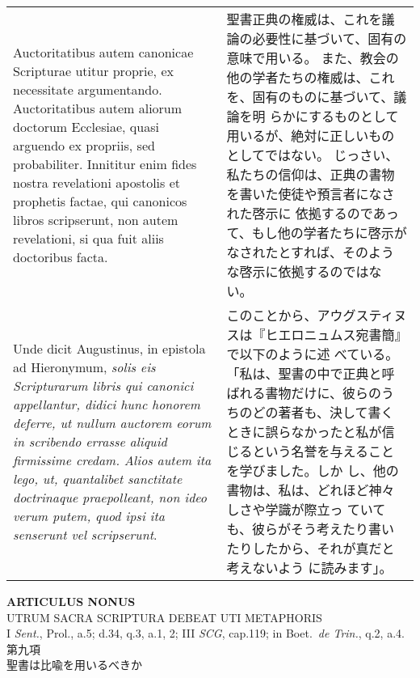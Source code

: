 \documentclass[10pt]{jsarticle} %
\begin{document}
\begin{longtable}{p{21em}p{21em}}
\\

Auctoritatibus autem canonicae Scripturae
utitur proprie, ex necessitate argumentando. Auctoritatibus autem
aliorum doctorum Ecclesiae, quasi arguendo ex propriis, sed
probabiliter. Innititur enim fides nostra revelationi apostolis et
prophetis factae, qui canonicos libros scripserunt, non autem
revelationi, si qua fuit aliis doctoribus facta. 


&

聖書正典の権威は、これを議論の必要性に基づいて、固有の意味で用いる。
また、教会の他の学者たちの権威は、これを、固有のものに基づいて、議論を明
 らかにするものとして用いるが、絶対に正しいものとしてではない。
じっさい、私たちの信仰は、正典の書物を書いた使徒や預言者になされた啓示に
 依拠するのであって、もし他の学者たちに啓示がなされたとすれば、そのよう
 な啓示に依拠するのではない。

\\

Unde dicit Augustinus,
in epistola ad Hieronymum, {\itshape solis eis Scripturarum libris qui canonici
appellantur, didici hunc honorem deferre, ut nullum auctorem eorum in
scribendo errasse aliquid firmissime credam. Alios autem ita lego, ut,
quantalibet sanctitate doctrinaque praepolleant, non ideo verum putem,
quod ipsi ita senserunt vel scripserunt}.


&

このことから、アウグスティヌスは『ヒエロニュムス宛書簡』で以下のように述
 べている。
「私は、聖書の中で正典と呼ばれる書物だけに、彼らのうちのどの著者も、決して書く
 ときに誤らなかったと私が信じるという名誉を与えることを学びました。しか
 し、他の書物は、私は、どれほど神々しさや学識が際立っ
 ていても、彼らがそう考えたり書いたりしたから、それが真だと考えないよう
 に読みます」。

\end{longtable}
\newpage


\begin{center}
 {\Large {\bf ARTICULUS NONUS}}\\
 {\large UTRUM SACRA SCRIPTURA DEBEAT UTI METAPHORIS}\\
 {\footnotesize I {\itshape Sent.}, Prol., a.5; d.34, q.3, a.1, 2; III
 {\itshape SCG}, cap.119; in Boet.~{\itshape de Trin.}, q.2, a.4.}\\
 {\Large 第九項\\聖書は比喩を用いるべきか}
\end{center}
\end{document}

